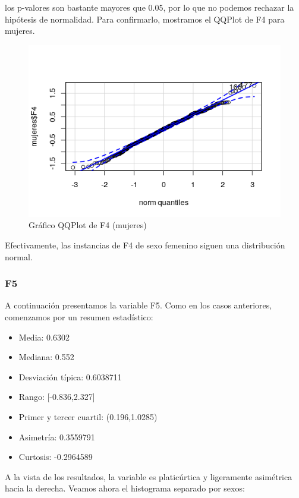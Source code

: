 los p-valores son bastante mayores que 0.05, por lo que no podemos rechazar la hipótesis de normalidad. Para confirmarlo, mostramos el QQPlot de F4 para mujeres.

\begin{figure}[H] %
	\centering
	\includegraphics[scale=0.6]{qq-F4m.png}  %
	\caption{Gráfico QQPlot de F4 (mujeres)} 
	\label{fig:qq-F4m}
\end{figure} 

Efectivamente, las instancias de F4 de sexo femenino siguen una distribución normal.

\subsubsection{F5}

A continuación presentamos la variable F5. Como en los casos anteriores, comenzamos por un resumen estadístico:
\begin{itemize}
	\item Media: 0.6302
	\item Mediana: 0.552
	\item Desviación típica: 0.6038711 
	\item Rango: [-0.836,2.327]
	\item Primer y tercer cuartil: (0.196,1.0285)
	\item Asimetría: 0.3559791
	\item Curtosis: -0.2964589
\end{itemize}

A la vista de los resultados, la variable es platicúrtica y ligeramente asimétrica hacia la derecha. Veamos ahora el histograma separado por sexos:

